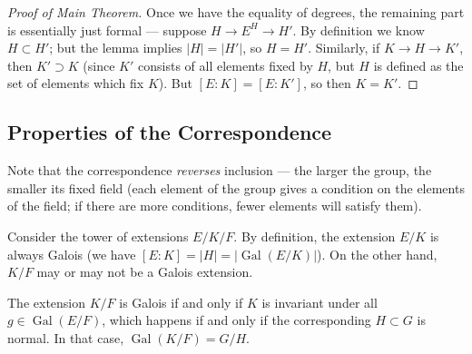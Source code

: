 \begin{proof}[Proof of Main Theorem]
Once we have the equality of degrees, the remaining part is essentially just formal --- suppose $H \to E^H \to H'$. By definition we know $H \subset H'$; but the lemma implies $\lvert H \rvert = \lvert H' \rvert$, so $H = H'$. Similarly, if $K \to H \to K'$, then $K' \supset K$ (since $K'$ consists of all elements fixed by $H$, but $H$ is defined as the set of elements which fix $K$). But $[E : K] = [E : K']$, so then $K = K'$. 
\end{proof}

\subsection{Properties of the Correspondence}

Note that the correspondence \emph{reverses} inclusion --- the larger the group, the smaller its fixed field (each element of the group gives a condition on the elements of the field; if there are more conditions, fewer elements will satisfy them). 

Consider the tower of extensions $E/K/F$. By definition, the extension $E/K$ is always Galois (we have $[E : K] = \lvert H \rvert = \lvert \operatorname{Gal}(E/K)\rvert$). On the other hand, $K/F$ may or may not be a Galois extension. 

\begin{proposition}
    The extension $K/F$ is Galois if and only if $K$ is invariant under all $g \in \operatorname{Gal}(E/F)$, which happens if and only if the corresponding $H \subset G$ is normal. In that case, $\operatorname{Gal}(K/F) = G/H$. 
\end{proposition}

